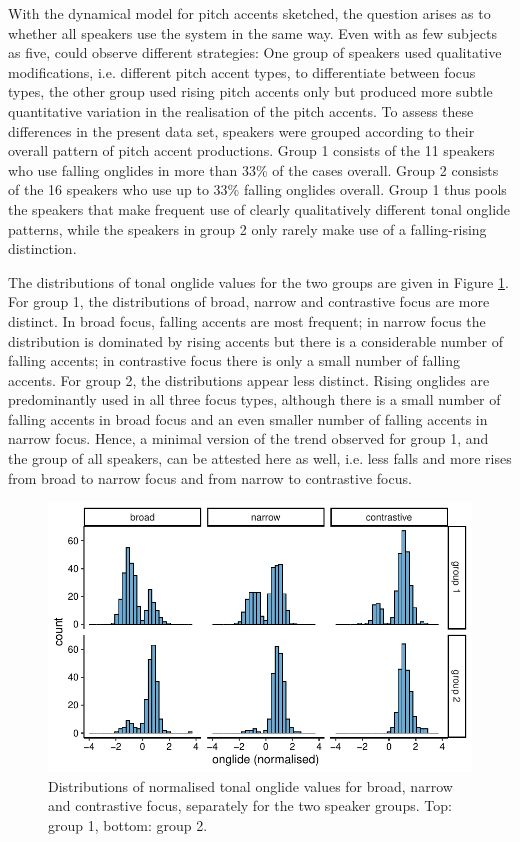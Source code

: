With the dynamical model for pitch accents sketched, the question arises as to whether all speakers use the system in the same way. Even with as few subjects as five, \citet{Griceetal2017} could observe different strategies: One group of speakers used qualitative modifications, i.e. different pitch accent types, to differentiate between focus types, the other group used rising pitch accents only but produced more subtle quantitative variation in the realisation of the pitch accents. To assess these differences in the present data set, speakers were grouped according to their overall pattern of pitch accent productions. Group 1 consists of the 11 speakers who use falling onglides in more than 33\% of the cases overall. Group 2 consists of the 16 speakers who use up to 33\% falling onglides overall. Group 1 thus pools the speakers that make frequent use of clearly qualitatively different tonal onglide patterns, while the speakers in group 2 only rarely make use of a falling-rising distinction. 

The distributions of tonal onglide values for the two groups are given in Figure \ref{fig:onglide_distributions_groups}. For group 1, the distributions of broad, narrow and contrastive focus are more distinct. In broad focus, falling accents are most frequent; in narrow focus the distribution is dominated by rising accents but there is a considerable number of falling accents; in contrastive focus there is only a small number of falling accents. For group 2, the distributions appear less distinct. Rising onglides are predominantly used in all three focus types, although there is a small number of falling accents in broad focus and an even smaller number of falling accents in narrow focus. Hence, a minimal version of the trend observed for group 1, and the group of all speakers, can be attested here as well, i.e. less falls and more rises from broad to narrow focus and from narrow to contrastive focus.

\begin{figure}
\includegraphics[width=\textwidth]{figures/ch6/onglide_norm_distribution_within_groups.pdf}
\caption[Distributions of normalised tonal onglide values for broad, narrow and contrastive focus, separately for the two speaker groups.]{Distributions of normalised tonal onglide values for broad, narrow and contrastive focus, separately for the two speaker groups. Top: group 1, bottom: group 2.}
\label{fig:onglide_distributions_groups}
\end{figure}

